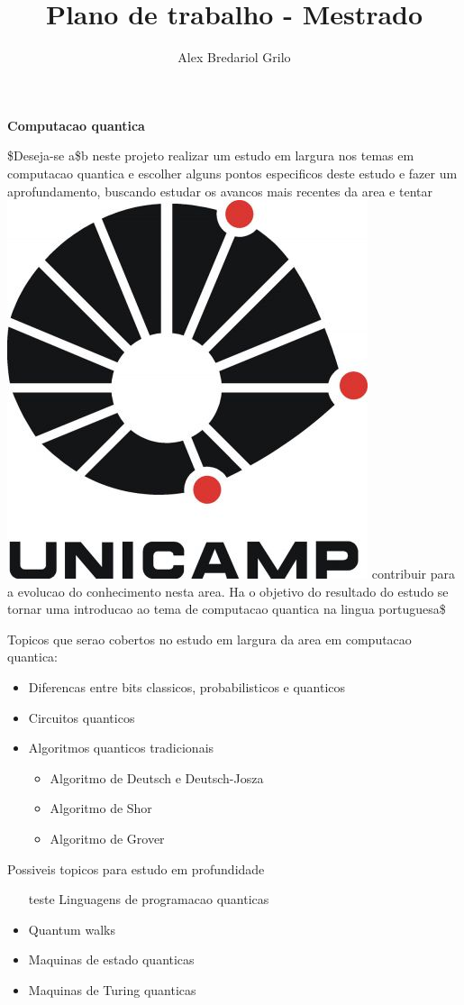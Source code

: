 \documentclass[a4paper,10pt]{article}
\title{Plano de trabalho - Mestrado}
\author{Alex Bredariol Grilo}
\begin{document}
\maketitle

\textbf{Computacao quantica}

\$Deseja-se a\$b neste projeto realizar um estudo em largura nos temas em computacao quantica e
escolher alguns pontos especificos deste estudo e fazer um aprofundamento, buscando
estudar os avancos mais recentes da area e tentar \includegraphics{teste.jpg} contribuir para a
evolucao do conhecimento nesta area. Ha o objetivo do resultado do estudo se tornar uma introducao ao tema de computacao
quantica na lingua portuguesa\$

Topicos que serao cobertos no estudo em largura da area em computacao quantica:
\begin{itemize}
\item Diferencas entre bits classicos, probabilisticos e quanticos
\item Circuitos quanticos
\item Algoritmos quanticos tradicionais
 \begin{itemize}
 \item Algoritmo de Deutsch e Deutsch-Josza
 \item Algoritmo de Shor
 \item Algoritmo de Grover
 \end{itemize}
\end{itemize}

Possiveis topicos para estudo em profundidade
\begin{itemize}
\item[teste] Linguagens de programacao quanticas
\item Quantum walks
\item Maquinas de estado quanticas
\item Maquinas de Turing quanticas
\end{itemize}
\end{document}

